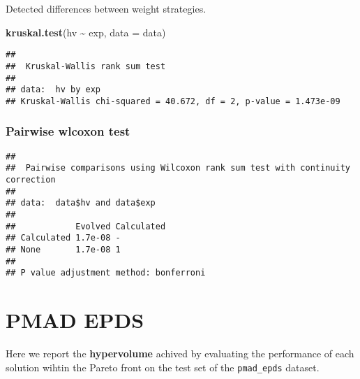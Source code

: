 \documentclass[
]{book}
\newenvironment{Shaded}{\begin{snugshade}}{\end{snugshade}}
\newcommand{\AttributeTok}[1]{\textcolor[rgb]{0.13,0.29,0.53}{#1}}
\newcommand{\ConstantTok}[1]{\textcolor[rgb]{0.56,0.35,0.01}{#1}}
\newcommand{\FunctionTok}[1]{\textcolor[rgb]{0.13,0.29,0.53}{\textbf{#1}}}
\newcommand{\NormalTok}[1]{#1}
\newcommand{\SpecialCharTok}[1]{\textcolor[rgb]{0.81,0.36,0.00}{\textbf{#1}}}
\newcommand{\StringTok}[1]{\textcolor[rgb]{0.31,0.60,0.02}{#1}}
\begin{document}
Detected differences between weight strategies.

\begin{Shaded}
\begin{Highlighting}[]
\FunctionTok{kruskal.test}\NormalTok{(hv }\SpecialCharTok{\textasciitilde{}}\NormalTok{ exp, }\AttributeTok{data =}\NormalTok{ data)}
\end{Highlighting}
\end{Shaded}

\begin{verbatim}
## 
##  Kruskal-Wallis rank sum test
## 
## data:  hv by exp
## Kruskal-Wallis chi-squared = 40.672, df = 2, p-value = 1.473e-09
\end{verbatim}

\hypertarget{pairwise-wlcoxon-test-9}{%
\subsection{Pairwise wlcoxon test}\label{pairwise-wlcoxon-test-9}}

\begin{Shaded}
\end{Shaded}

\begin{verbatim}
## 
##  Pairwise comparisons using Wilcoxon rank sum test with continuity correction 
## 
## data:  data$hv and data$exp 
## 
##            Evolved Calculated
## Calculated 1.7e-08 -         
## None       1.7e-08 1         
## 
## P value adjustment method: bonferroni
\end{verbatim}

\hypertarget{pmad-epds}{%
\chapter{PMAD EPDS}\label{pmad-epds}}

Here we report the \textbf{hypervolume} achived by evaluating the performance of each solution wihtin the Pareto front on the test set of the \texttt{pmad\_epds} dataset.
\end{document}
